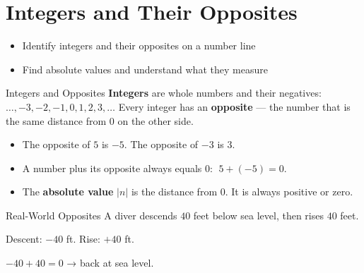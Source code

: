 \section{Integers and Their Opposites}

\begin{learningGoals}
\begin{itemize}
    \item Identify integers and their opposites on a number line
    \item Find absolute values and understand what they measure
\end{itemize}
\end{learningGoals}

\begin{conceptBox}{Integers and Opposites}
\textbf{Integers} are whole numbers and their negatives: $\ldots, -3, -2, -1, 0, 1, 2, 3, \ldots$
Every integer has an \textbf{opposite} — the number that is the same distance from $0$ on the other side.
\begin{itemize}[leftmargin=*]
    \item The opposite of $5$ is $-5$. The opposite of $-3$ is $3$.
    \item A number plus its opposite always equals $0$: $\;5 + (-5) = 0$.
    \item The \textbf{absolute value} $|n|$ is the distance from $0$. It is always positive or zero.
\end{itemize}
\end{conceptBox}


\begin{workedExample}{Real-World Opposites}
A diver descends $40$ feet below sea level, then rises $40$ feet.

Descent: $-40$ ft. \quad Rise: $+40$ ft.

$-40 + 40 = 0$ → back at sea level.

\end{workedExample}


